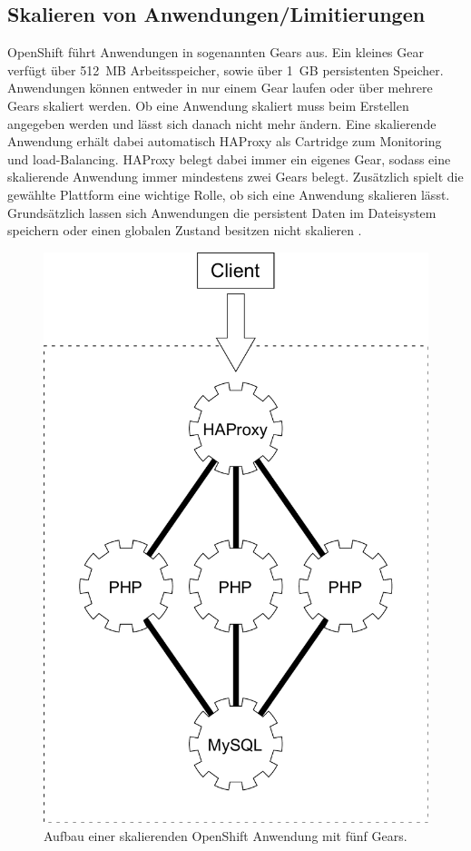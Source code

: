 \documentclass[10pt,a4paper,compsoc]{IEEEtran}
\begin{document}
\subsection{Skalieren von Anwendungen/Limitierungen}
\label{sec:scale}
OpenShift führt Anwendungen in sogenannten Gears aus. Ein kleines Gear verfügt über 512~MB Arbeitsspeicher, sowie über 1~GB persistenten Speicher. Anwendungen können entweder in nur einem Gear laufen oder über mehrere Gears skaliert werden. Ob eine Anwendung skaliert muss beim Erstellen angegeben werden und lässt sich danach nicht mehr ändern. Eine skalierende Anwendung erhält dabei automatisch HAProxy als Cartridge zum Monitoring und load-Balancing. HAProxy belegt dabei immer ein eigenes Gear, sodass eine skalierende Anwendung immer mindestens zwei Gears belegt. Zusätzlich spielt die gewählte Plattform eine wichtige Rolle, ob sich eine Anwendung skalieren lässt. Grundsätzlich lassen sich Anwendungen die persistent Daten im Dateisystem speichern oder einen globalen Zustand besitzen nicht skalieren \cite[S.28]{os_user_guide}.

\begin{figure}[htbp]
\centering
\includegraphics[width=0.8\linewidth]{imgs/scaling}
\caption{Aufbau einer skalierenden OpenShift Anwendung mit fünf Gears.}
\label{fig:scaling}
\end{figure}
\end{document}
